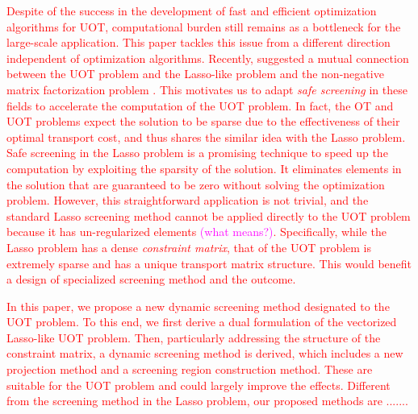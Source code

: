 \documentclass[twoside]{article}
\theoremstyle{plain}
\newcommand{\changeHK}[1]{\textcolor{red}{#1}}
\newcommand{\note}[1]{\textcolor{magenta}{#1}}
\begin{document}
\changeHK{
Despite of the success in the development of fast and efficient optimization algorithms for UOT, computational burden still remains as a bottleneck for the large-scale application. This paper tackles this issue from a different direction independent of optimization algorithms. Recently, \cite{Chapel_NeurIPS_2021} suggested a mutual connection between the UOT problem and the Lasso-like problem \citep{Tibshirani_JRSS_1996,Efron_AM_2004} and the non-negative matrix factorization problem \citep{Lee_NIPS_2000}. This motivates us to adapt {\it safe screening} \citep{ghaoui2010safe} in these fields to accelerate the computation of the UOT problem. In fact, the OT and UOT problems expect the solution to be sparse due to the effectiveness of their optimal transport cost, and thus shares the similar idea with the Lasso problem. 
Safe screening in the Lasso problem is a promising technique to speed up the computation by exploiting the sparsity of the solution. It eliminates elements in the solution that are guaranteed to be zero without solving the optimization problem. However, this straightforward application is not trivial, and the standard Lasso screening method cannot be applied directly to the UOT problem because it has un-regularized elements \note{(what means?)}. 
Specifically, while the Lasso problem has a dense {\it constraint matrix}, that of the UOT problem is extremely sparse and has a unique transport matrix structure. This would benefit a design of specialized screening method and the outcome. 
%
}

\changeHK{
In this paper, we propose a new dynamic screening method designated to the UOT problem. To this end, we first derive a dual formulation of the vectorized Lasso-like UOT problem. Then, particularly addressing the structure of the constraint matrix, a dynamic screening method is derived, which includes a new projection method and a screening region construction method. These are suitable for the UOT problem and could largely improve the effects. Different from the screening method in the Lasso problem, our proposed methods are .......
}
\end{document}
